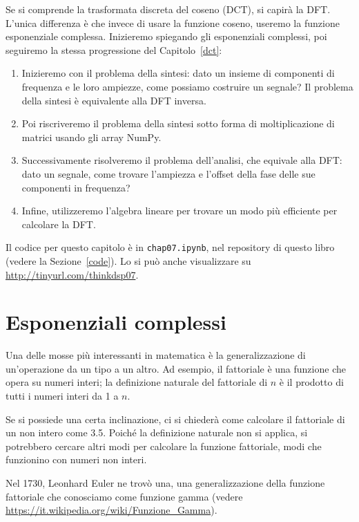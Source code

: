 \documentclass[12pt]{book} \usepackage[width=5.5in,height=8.5in, hmarginratio=3:2,vmarginratio=1:1]{geometry}
\begin{document}
Se si comprende la trasformata discreta del coseno (DCT), si capirà la DFT. L'unica differenza è che invece di usare la funzione coseno, useremo la funzione esponenziale complessa. Inizieremo spiegando gli esponenziali complessi, poi seguiremo la stessa progressione del Capitolo~\ref{dct}:

\begin{enumerate} 

\item Inizieremo con il problema della sintesi: dato un insieme di componenti di frequenza e le loro ampiezze, come possiamo costruire un segnale? Il problema della sintesi è equivalente alla DFT inversa.

\item Poi riscriveremo il problema della sintesi sotto forma di moltiplicazione di matrici usando gli array NumPy.

\item Successivamente risolveremo il problema dell'analisi, che equivale alla DFT: dato un segnale, come trovare l'ampiezza e l'offset della fase delle sue componenti in frequenza?

\item Infine, utilizzeremo l'algebra lineare per trovare un modo più efficiente per calcolare la DFT.

\end{enumerate} 

Il codice per questo capitolo è in {\tt chap07.ipynb}, nel repository di questo libro (vedere la Sezione~\ref{code}). Lo si può anche visualizzare su \url{http://tinyurl.com/thinkdsp07}.

\section{Esponenziali complessi} 

Una delle mosse più interessanti in matematica è la generalizzazione di un'operazione da un tipo a un altro. Ad esempio, il fattoriale è una funzione che opera su numeri interi; la definizione naturale del fattoriale di $n$ è il prodotto di tutti i numeri interi da 1 a $n$.

Se si possiede una certa inclinazione, ci si chiederà come calcolare il fattoriale di un non intero come 3.5. Poiché la definizione naturale non si applica, si potrebbero cercare altri modi per calcolare la funzione fattoriale, modi che funzionino con numeri non interi.

Nel 1730, Leonhard Euler ne trovò una, una generalizzazione della funzione fattoriale che conosciamo come funzione gamma (vedere \url{https://it.wikipedia.org/wiki/Funzione_Gamma}).
\end{document}
